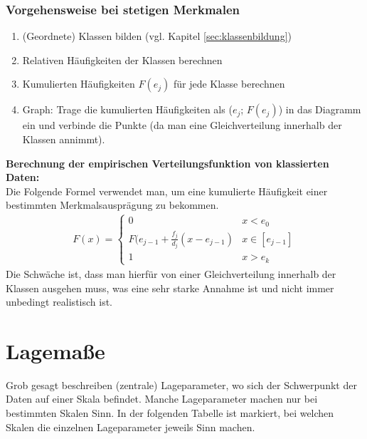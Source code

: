 \documentclass[a4paper]{article}
\begin{document}
\subsubsection{Vorgehensweise bei stetigen Merkmalen}
\begin{enumerate}
    \item (Geordnete) Klassen bilden (vgl. Kapitel \ref{sec:klassenbildung})
    \item Relativen Häufigkeiten der Klassen berechnen
    \item Kumulierten Häufigkeiten $F(e_j)$ für jede Klasse berechnen
    \item Graph: Trage die kumulierten Häufigkeiten als ($e_j$; $F(e_j)$) in das Diagramm ein und verbinde die Punkte (da man eine Gleichverteilung innerhalb der Klassen annimmt).
\end{enumerate}
\textbf{Berechnung der empirischen Verteilungsfunktion von klassierten Daten:}\\
Die Folgende Formel verwendet man, um eine kumulierte Häufigkeit einer bestimmten Merkmalsausprägung zu bekommen.
\begin{align*}
    F(x)=\begin{cases}
			0      & x < e_0        \\
            F(e_{j-1}+\frac{f_j}{d_j}(x-e_{j-1}) & x \in[e_{j-1}]\\
            1      &x>e_k
		 \end{cases}
\end{align*}
Die Schwäche ist, dass man hierfür von einer Gleichverteilung innerhalb der Klassen ausgehen muss, was eine sehr starke Annahme ist und nicht immer unbedingt realistisch ist.\\

\noindent {}


\clearpage


\section{Lagemaße}
Grob gesagt beschreiben (zentrale) Lageparameter, wo sich der Schwerpunkt der Daten auf einer Skala befindet. Manche Lageparameter machen nur bei bestimmten Skalen Sinn. In der folgenden Tabelle ist markiert, bei welchen Skalen die einzelnen Lageparameter jeweils Sinn machen.
\end{document}
